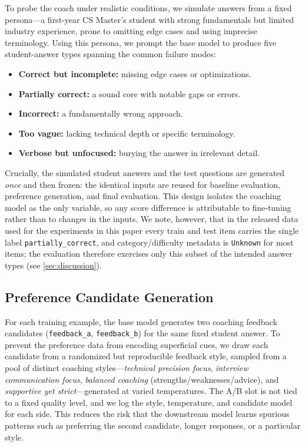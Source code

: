 \documentclass[10pt,twocolumn,letterpaper]{article}
\begin{document}
To probe the coach under realistic conditions, we simulate answers from a fixed persona---a first-year CS Master's student with strong fundamentals but limited industry experience, prone to omitting edge cases and using imprecise terminology. Using this persona, we prompt the base model to produce five student-answer types spanning the common failure modes:
\begin{itemize}
    \item \textbf{Correct but incomplete:} missing edge cases or optimizations.
    \item \textbf{Partially correct:} a sound core with notable gaps or errors.
    \item \textbf{Incorrect:} a fundamentally wrong approach.
    \item \textbf{Too vague:} lacking technical depth or specific terminology.
    \item \textbf{Verbose but unfocused:} burying the answer in irrelevant detail.
\end{itemize}
Crucially, the simulated student answers and the test questions are generated \emph{once} and then frozen: the identical inputs are reused for baseline evaluation, preference generation, and final evaluation. This design isolates the coaching model as the only variable, so any score difference is attributable to fine-tuning rather than to changes in the inputs. We note, however, that in the released data used for the experiments in this paper every train and test item carries the single label \texttt{partially\_correct}, and category/difficulty metadata is \texttt{Unknown} for most items; the evaluation therefore exercises only this subset of the intended answer types (see \cref{sec:discussion}).

\subsection{Preference Candidate Generation}
For each training example, the base model generates two coaching feedback candidates (\texttt{feedback\_a}, \texttt{feedback\_b}) for the same fixed student answer. To prevent the preference data from encoding superficial cues, we draw each candidate from a randomized but reproducible feedback style, sampled from a pool of distinct coaching styles---\emph{technical precision focus}, \emph{interview communication focus}, \emph{balanced coaching} (strengths/weaknesses/advice), and \emph{supportive yet strict}---generated at varied temperatures. The A/B slot is not tied to a fixed quality level, and we log the style, temperature, and candidate model for each side. This reduces the risk that the downstream model learns spurious patterns such as preferring the second candidate, longer responses, or a particular style.
\end{document}
